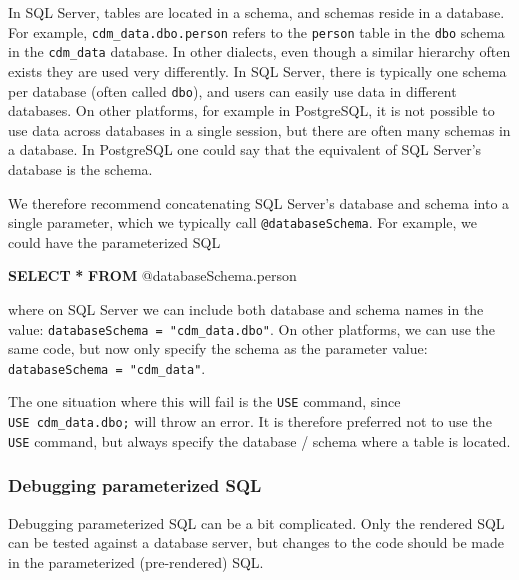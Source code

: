 \documentclass[11pt]{book}
\newenvironment{Shaded}{\begin{snugshade}}{\end{snugshade}}
\newcommand{\KeywordTok}[1]{\textcolor[rgb]{0.13,0.29,0.53}{\textbf{#1}}}
\newcommand{\NormalTok}[1]{#1}
\newcommand{\OperatorTok}[1]{\textcolor[rgb]{0.81,0.36,0.00}{\textbf{#1}}}
\theoremstyle{definition}
\theoremstyle{definition}
\theoremstyle{definition}
\theoremstyle{remark}
\begin{document}
In SQL Server, tables are located in a schema, and schemas reside in a database. For example, \texttt{cdm\_data.dbo.person} refers to the \texttt{person} table in the \texttt{dbo} schema in the \texttt{cdm\_data} database. In other dialects, even though a similar hierarchy often exists they are used very differently. In SQL Server, there is typically one schema per database (often called \texttt{dbo}), and users can easily use data in different databases. On other platforms, for example in PostgreSQL, it is not possible to use data across databases in a single session, but there are often many schemas in a database. In PostgreSQL one could say that the equivalent of SQL Server's database is the schema.

We therefore recommend concatenating SQL Server's database and schema into a single parameter, which we typically call \texttt{@databaseSchema}. For example, we could have the parameterized SQL

\begin{Shaded}
\begin{Highlighting}[]
\KeywordTok{SELECT} \OperatorTok{*} \KeywordTok{FROM}\NormalTok{ @databaseSchema.person}
\end{Highlighting}
\end{Shaded}

where on SQL Server we can include both database and schema names in the value: \texttt{databaseSchema\ =\ "cdm\_data.dbo"}. On other platforms, we can use the same code, but now only specify the schema as the parameter value: \texttt{databaseSchema\ =\ "cdm\_data"}.

The one situation where this will fail is the \texttt{USE} command, since \texttt{USE\ cdm\_data.dbo;} will throw an error. It is therefore preferred not to use the \texttt{USE} command, but always specify the database / schema where a table is located.

\hypertarget{debugging-parameterized-sql}{%
\subsubsection*{Debugging parameterized SQL}\label{debugging-parameterized-sql}}

Debugging parameterized SQL can be a bit complicated. Only the rendered SQL can be tested against a database server, but changes to the code should be made in the parameterized (pre-rendered) SQL. 
\end{document}
